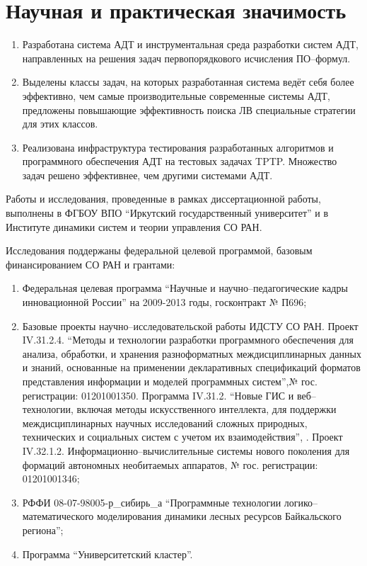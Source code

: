 \section*{Научная и практическая значимость}
\begin{enumerate}
\item Разработана система АДТ и инструментальная среда разработки систем АДТ, направленных на решения задач первопорядкового исчисления ПО--формул.
\item Выделены классы задач, на которых разработанная система ведёт себя более эффективно, чем самые производительные современные системы АДТ, предложены повышающие эффективность поиска ЛВ специальные стратегии для этих классов.
\item Реализована инфраструктура тестирования разработанных алгоритмов и программного обеспечения АДТ на тестовых задачах TPTP. Множество задач решено эффективнее, чем другими системами АДТ.
\end{enumerate}


Работы и исследования, проведенные в рамках  диссертационной работы, выполнены в ФГБОУ ВПО ``Иркутский государственный университет'' и в Институте динамики систем и теории управления СО РАН.

Исследования поддержаны федеральной целевой программой, базовым финансированием СО РАН и грантами:
\begin{enumerate}
\item Федеральная целевая программа ``Научные и научно--педагогические кадры инновационной России'' на 2009-2013 годы, госконтракт № П696;
\item Базовые проекты научно--исследовательской работы ИДСТУ СО РАН. Проект IV.31.2.4. ``Методы и технологии разработки программного обеспечения для анализа, обработки, и хранения разноформатных междисциплинарных данных и знаний, основанные на применении декларативных спецификаций форматов представления информации и моделей программных систем'',№ гос. регистрации: 01201001350. Программа IV.31.2. ``Новые ГИС и веб--технологии, включая методы искусственного интеллекта, для поддержки междисциплинарных научных исследований сложных природных, технических и социальных систем с учетом их взаимодействия'', . Проект IV.32.1.2. Информационно--вычислительные системы нового поколения для формаций автономных необитаемых аппаратов, № гос. регистрации: 01201001346;
\item РФФИ 08-07-98005-р\_сибирь\_а ``Программные технологии логико--математического моделирования динамики лесных ресурсов Байкальского региона'';
\item Программа ``Университетский кластер''.
\end{enumerate}

